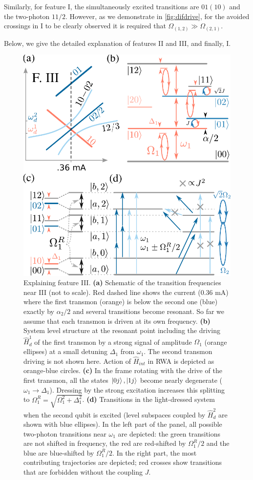 \documentclass[%
 pra,
 amsmath,amssymb,
 reprint,%
]{revtex4-1}
\begin{document}
Similarly, for feature I, the simultaneously excited transitions are $01 (10)$ and the two-photon $11/2$. However, as we demonstrate in \autoref{fig:difdrive}, for the avoided crossings in I to be clearly observed it is required that $\Omega_{(1,2)} \gg \Omega_{(2,1)}$. 

Below, we give the detailed explanation of features II and III, and finally, I.

\begin{figure}
	\centering
	\includegraphics[width=\linewidth]{main_scheme_2}  
	\caption{Explaining feature III. \textbf{(a)} Schematic of the transition frequencies near III (not to scale). Red dashed line shows the current (0.36 mA) where the first transmon (orange) is below the second one (blue) exactly by $\alpha_2/2$ and several transitions become resonant. So far we assume that each transmon is driven at its own frequency. \textbf{(b)} System level structure at the resonant point including the driving $\hat H_{d}^1$ of the first transmon by a strong signal of amplitude $\Omega_1$ (orange ellipses) at a small detuning $\Delta_1$ from $\omega_1$. The second transmon driving is not shown here. Action of $\hat H_{int}$ in RWA is depicted as orange-blue circles. \textbf{(c)} In the frame rotating with the drive of the first transmon, all the states $\ket{0j},\ket{1j}$ become nearly degenerate ($\omega_1 \rightarrow \Delta_1$). Dressing by the strong excitation increases this splitting to $\Omega_1^R = \sqrt{\Omega_1^2 + \Delta_1^2}$. \textbf{(d)} Transitions in the light-dressed system when the second qubit is excited (level subspaces coupled by $\hat H_{d}^2$ are shown with blue ellipses). In the left part of the panel, all possible two-photon transitions near $\omega_1$ are depicted: the green transitions are not shifted in frequency, the red are red-shifted by $\Omega^R_1/2$ and the blue are blue-shifted by $\Omega^R_1/2$. In the right part, the most contributing trajectories are depicted; red crosses show transitions that are forbidden without the coupling $J$.}

\end{figure}
\end{document}
